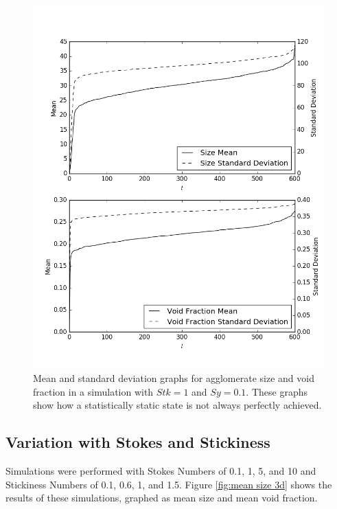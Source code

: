 \documentclass[a4paper,11pt,titlepage]{report}
\begin{document}
\begin{figure}[!htb]
\centering
\includegraphics[scale=0.6]{figures/analysis/end_increase.png}
\caption{Mean and standard deviation graphs for agglomerate size and void fraction in a simulation with $Stk = 1$ and $Sy = 0.1$. These graphs show how a statistically static state is not always perfectly achieved.}
\label{fig:end increase}
\end{figure}
\subsection{Variation with Stokes and Stickiness}
\label{sec:variation with properties}
Simulations were performed with Stokes Numbers of 0.1, 1, 5, and 10 and Stickiness Numbers of 0.1, 0.6, 1, and 1.5. Figure \ref{fig:mean size 3d} shows the results of these simulations, graphed as mean size and mean void fraction.
\end{document}
